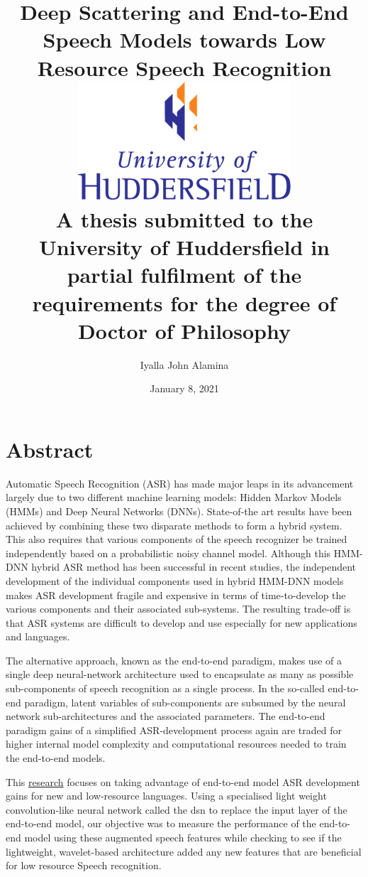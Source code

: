 \documentclass[12pt,twoside]{report}
\title{
    {Deep Scattering and End-to-End Speech Models towards Low Resource Speech Recognition}\\
    {\includegraphics{university.png}\\
A thesis submitted to the University of Huddersfield in partial fulfilment of the requirements for the degree of Doctor of Philosophy}
}
\author{Iyalla John Alamina}
\date{January 8, 2021}
\begin{document}
\makeglossaries


\maketitle
\DeclareRobustCommand{\startblue}{%
  \leavevmode
  \color{blue}
}
\DeclareRobustCommand{\stopblue}{%
  \normalcolor
}


\chapter*{Abstract}
\startblue
Automatic Speech Recognition (ASR) has made major leaps in its advancement largely due to two different machine learning models: Hidden Markov Models (HMMs) and Deep Neural Networks (DNNs).  State-of-the art results have been achieved by combining these two disparate methods to form a hybrid system.  This also requires that various components of the speech recognizer be trained independently based on a probabilistic noisy channel model.  Although this HMM-DNN hybrid ASR method has been successful in recent studies, the independent development of the individual components used in hybrid HMM-DNN models makes ASR development fragile and expensive in terms of time-to-develop the various components and their associated sub-systems.  The resulting trade-off is that ASR systems are difficult to develop and use especially for new applications and languages.

The alternative approach, known as the end-to-end paradigm, makes use of a single deep neural-network architecture used to encapsulate as many as possible sub-components of speech recognition as a single process.  In the so-called end-to-end paradigm, latent variables of sub-components are subsumed by the neural network sub-architectures and the associated parameters.  The end-to-end paradigm gains of a simplified ASR-development process again are traded for higher internal model complexity and computational resources needed to train the end-to-end models. 

This \href{https://docs.google.com/document/d/1ne2ctaxjpOlilMDg88aTtzOdIyP-wI2_ST5mGDvAYMw/edit?usp=sharing}{research} focuses on taking advantage of end-to-end model ASR development gains for new and low-resource languages. Using a specialised light weight convolution-like neural network called the \acrfull{dsn} to replace the input layer of the end-to-end model, our objective was to measure the performance of the end-to-end model using these augmented speech features while checking to see if the lightweight, wavelet-based architecture added any new features that are beneficial for low resource Speech recognition. 
\end{document}

